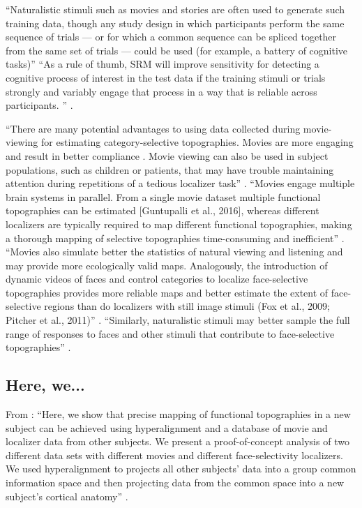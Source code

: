 ``Naturalistic stimuli such as movies and stories are often used to generate
such training data, though any study design in which participants perform the
same sequence of trials --- or for which a common sequence can be spliced
together from the same set of trials --- could be used (for example, a battery
of cognitive tasks)'' \citep{cohen2017computational}
%
``As a rule of thumb, SRM will improve sensitivity for detecting a cognitive
process of interest in the test data if the training stimuli or trials strongly
and variably engage that process in a way that is reliable across participants.
'' \citep{cohen2017computational}.

%
``There are many potential advantages to using data collected during
movie-viewing for estimating category-selective topographies. Movies are more
engaging and result in better compliance \citep{vanderwal2015inscapes}. Movie
viewing can also be used in subject populations, such as children
\citep{richardson2018development} or patients, that may have trouble maintaining
attention during repetitions of a tedious localizer task''
\citep{jiahui2020predicting}.
%
``Movies engage multiple brain systems in parallel. From a single movie dataset
multiple functional topographies can be estimated [Guntupalli et al., 2016],
whereas different localizers are typically required to map different functional
topographies, making a thorough mapping of selective topographies time-consuming
and inefficient'' \citep{jiahui2020predicting}.
%
``Movies also simulate better the statistics of natural viewing and listening
and may provide more ecologically valid maps. Analogously, the introduction of
dynamic videos of faces and control categories to localize face-selective
topographies provides more reliable maps and better estimate the extent of
face-selective regions than do localizers with still image stimuli (Fox et al.,
2009; Pitcher et al., 2011)'' \citep{jiahui2020predicting}.
%
``Similarly, naturalistic stimuli may better sample the full range of responses
to faces and other stimuli that contribute to face-selective topographies''
\citep{jiahui2020predicting}.


\subsection{Here, we...}

From \citet{jiahui2020predicting}: ``Here, we show that precise mapping of
functional topographies in a new subject can be achieved using hyperalignment
and a database of movie and localizer data from other subjects.
%
We present a proof-of-concept analysis of two different data sets with different
movies and different face-selectivity localizers.
%
We used hyperalignment to projects all other subjects' data into a group common
information space and then projecting data from the common space into a new
subject's cortical anatomy'' \citep{jiahui2020predicting}.


